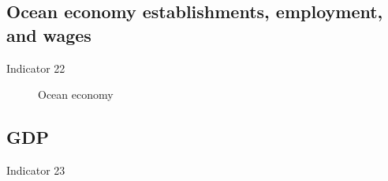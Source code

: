 \documentclass[
  letterpaper,
  oneside,
  open=any]{scrbook}
\begin{document}
\subsection{Ocean economy establishments, employment, and
wages}\label{ocean-economy-establishments-employment-and-wages}

Indicator 22

\begin{figure}


\caption{\label{fig-NAICS}Ocean economy}

\end{figure}%

\subsection{GDP}\label{gdp}

Indicator 23
\end{document}
